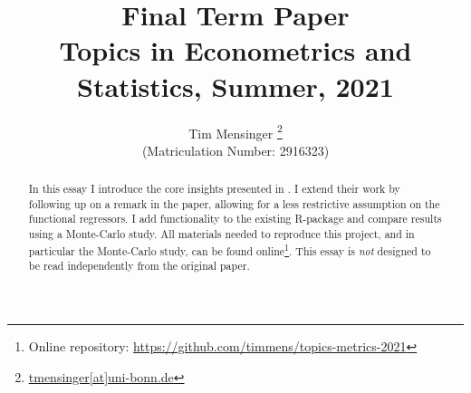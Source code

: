 \documentclass[a4paper, 12pt]{article}
\title{\textbf{Final Term Paper}\\
    \Large Topics in Econometrics and Statistics, Summer, 2021
}
\date{}
\author{Tim Mensinger%
  \thanks{\href{mailto:tmensinger@uni-bonn.de}{tmensinger[at]uni-bonn.de}}\\[-0.5em]
  {\small(Matriculation Number: 2916323)}
}
\affil{University of Bonn}
\begin{document}
\onehalfspacing


\maketitle
\begin{abstract}
    In this essay I introduce the core insights presented in \cite{Kneip2020}. I extend
    their work by following up on a remark in the paper, allowing for a less restrictive
    assumption on the functional regressors. I add functionality to the existing
    \textsf{R}-package and compare results using a Monte-Carlo study. All materials
    needed to reproduce this project, and in particular the Monte-Carlo study, can be
    found online\footnote{Online repository:
    \url{https://github.com/timmens/topics-metrics-2021}}. This essay is \emph{not}
    designed to be read independently from the original paper.
\end{abstract}
\thispagestyle{empty}

\newpage






\printbibliography
\end{document}
